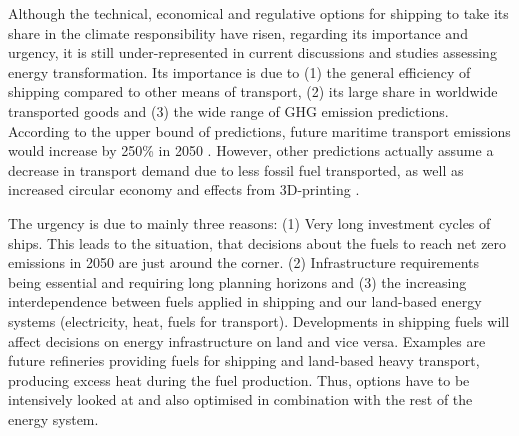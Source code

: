 \documentclass[article]{elsarticle}
\begin{document}
Although the technical, economical and regulative options for shipping to take its share in the climate responsibility have risen, regarding its importance and urgency, it is still under-represented in current discussions and studies assessing energy transformation. Its importance is due to (1) the general efficiency of shipping compared to other means of transport, (2) its large share in worldwide transported goods and (3) the wide range of GHG emission  predictions. According to the upper bound of predictions, future maritime transport emissions would increase by 250\% in 2050 \cite{EuropeanCommission2018}. However, other predictions actually assume a decrease in transport demand due to less fossil fuel transported, as well as increased circular economy and effects from 3D-printing \cite{ITF2018}. %

The urgency is due to mainly three reasons: (1) Very long investment cycles of ships. This leads to the situation, that decisions about the fuels to reach net zero emissions in 2050 are just around the corner. (2) Infrastructure requirements being essential and requiring long planning horizons and (3) the increasing interdependence between fuels applied in shipping and our land-based energy systems (electricity, heat, fuels for transport). Developments in shipping fuels will affect decisions on energy infrastructure on land and vice versa. Examples are future refineries providing fuels for shipping and land-based heavy transport, producing excess heat during the fuel production. Thus, options have to be intensively looked at and also optimised in combination with the rest of the energy system. 
\end{document}
